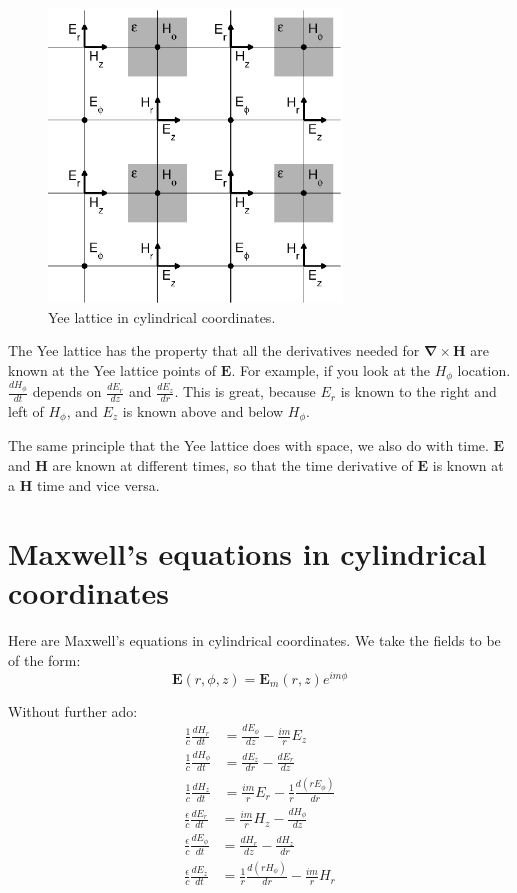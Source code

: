 \documentclass[floats]{book}
\begin{document}
\begin{figure}
\caption{Yee lattice in cylindrical coordinates.
\label{yee_fig}}
\centering
\includegraphics[width=7.8cm,clip=true]{Yee_bulk}
\end{figure}

The Yee lattice has the property that all the derivatives needed for
$\mathbf \nabla \times \mathbf H$ are known at the Yee lattice points of
$\mathbf E$.  For example, if you look at the $H_\phi$ location.
$\frac{dH_\phi}{dt}$ depends on $\frac{dE_r}{dz}$ and $\frac{dE_z}{dr}$.
This is great, because $E_r$ is known to the right and left of $H_\phi$,
and $E_z$ is known above and below $H_\phi$.

The same principle that the Yee lattice does with space, we also do with
time.  $\mathbf E$ and $\mathbf H$ are known at different times, so that
the time derivative of $\mathbf E$ is known at a $\mathbf H$ time and vice
versa.

\section{Maxwell's equations in cylindrical coordinates}

Here are Maxwell's equations in cylindrical coordinates.  We take the
fields to be of the form:
\begin{equation*}
\mathbf{E}(r,\phi,z) = \mathbf{E}_m(r,z)e^{i m \phi} 
\end{equation*}

Without further ado:
\begin{align}
\frac1c\frac{dH_r}{dt} &= \frac{dE_\phi}{dz} - \frac{im}r E_z\\
\frac1c\frac{dH_\phi}{dt} &= \frac{dE_z}{dr} - \frac{dE_r}{dz}\\
\frac1c\frac{dH_z}{dt} &= \frac{im}r E_r - \frac1r\frac{d(rE_\phi)}{dr}
\end{align}
\begin{align}
\frac\epsilon c\frac{dE_r}{dt} &= \frac{im}r H_z - \frac{dH_\phi}{dz} \\
\frac\epsilon c\frac{dE_\phi}{dt} &= \frac{dH_r}{dz} - \frac{dH_z}{dr} \\
\frac\epsilon c\frac{dE_z}{dt} &= \frac1r\frac{d(rH_\phi)}{dr} - \frac{im}r H_r
\end{align}
\end{document}

